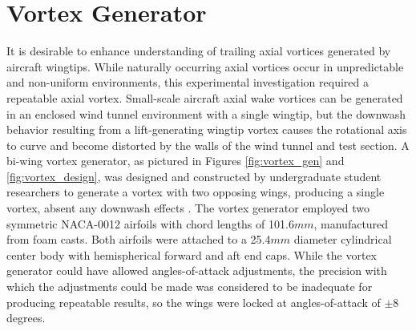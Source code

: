 \section{Vortex Generator}

It is desirable to enhance understanding of 
trailing axial vortices generated by aircraft wingtips.
While naturally occurring axial vortices occur in unpredictable and non-uniform 
environments, this experimental investigation required a repeatable axial 
vortex.  Small-scale aircraft axial wake vortices can be generated in an 
enclosed wind tunnel environment with a single wingtip, but the downwash 
behavior resulting from a lift-generating wingtip vortex causes the rotational 
axis to curve and become distorted by the walls of the wind tunnel and
test section. A bi-wing vortex generator, as pictured in Figures 
\ref{fig:vortex_gen} and \ref{fig:vortex_design}, was designed and constructed 
by undergraduate student researchers to generate a vortex with two opposing 
wings, producing a single vortex, absent any downwash effects \cite{davis2012}. 
The vortex generator employed two symmetric NACA-0012
airfoils with chord lengths of 101.6$mm$, manufactured from foam casts. Both 
airfoils were attached 
to a 25.4$mm$ diameter cylindrical center body with hemispherical forward and 
aft end caps. While the vortex generator could have allowed angles-of-attack 
adjustments, the precision with which the adjustments could be made was 
considered to be inadequate for producing repeatable results, so the wings were 
locked at angles-of-attack of $\pm$8 degrees.

